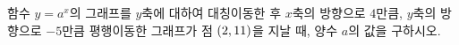 함수 $y=a^x$의 그래프를 $y$축에 대하여 대칭이동한 후 $x$축의 방향으로 $4$만큼, $y$축의 방향으로 $-5$만큼 평행이동한 그래프가 점 $(2{,}\mkern3mu\mathopen{}11)$을 지날 때, 양수 $a$의 값을 구하시오.
